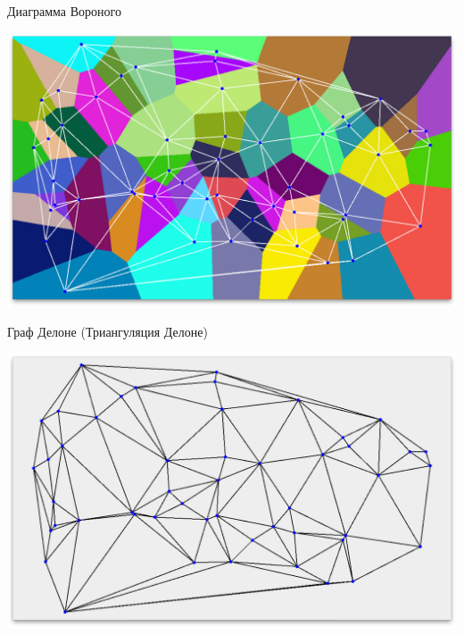 \documentclass[14pt, fleqn, xcolor={dvipsnames, table}]{beamer}
\begin{document}
        \begin{frame}{Диаграмма Вороного}
            \begin{center}
	            \includegraphics[scale=0.295]{voronoi-2.png}
	        \end{center}       
        \end{frame}
        
        \begin{frame}{Граф Делоне (Триангуляция Делоне)}
            \begin{center}
	            \includegraphics[scale=0.295]{voronoi-3.png}
	        \end{center}       
        \end{frame}
        
\end{document}
